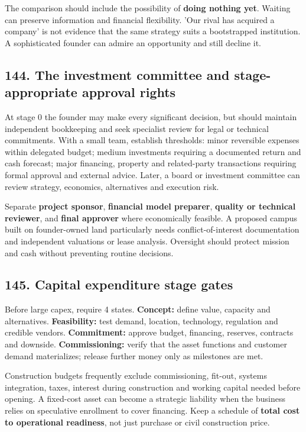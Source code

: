 The comparison should include the possibility of \textbf{doing nothing yet}. Waiting can preserve information and financial flexibility. 'Our rival has acquired a company' is not evidence that the same strategy suits a bootstrapped institution. A sophisticated founder can admire an opportunity and still decline it.

\subsection{144. The investment committee and stage-appropriate approval rights}


At stage 0 the founder may make every significant decision, but should maintain independent bookkeeping and seek specialist review for legal or technical commitments. With a small team, establish thresholds: minor reversible expenses within delegated budget; medium investments requiring a documented return and cash forecast; major financing, property and related-party transactions requiring formal approval and external advice. Later, a board or investment committee can review strategy, economics, alternatives and execution risk.

Separate \textbf{project sponsor}, \textbf{financial model preparer}, \textbf{quality or technical reviewer}, and \textbf{final approver} where economically feasible. A proposed campus built on founder-owned land particularly needs conflict-of-interest documentation and independent valuations or lease analysis. Oversight should protect mission and cash without preventing routine decisions.

\subsection{145. Capital expenditure stage gates}


Before large capex, require 4 states. \textbf{Concept:} define value, capacity and alternatives. \textbf{Feasibility:} test demand, location, technology, regulation and credible vendors. \textbf{Commitment:} approve budget, financing, reserves, contracts and downside. \textbf{Commissioning:} verify that the asset functions and customer demand materializes; release further money only as milestones are met.

Construction budgets frequently exclude commissioning, fit-out, systems integration, taxes, interest during construction and working capital needed before opening. A fixed-cost asset can become a strategic liability when the business relies on speculative enrollment to cover financing. Keep a schedule of \textbf{total cost to operational readiness}, not just purchase or civil construction price.

